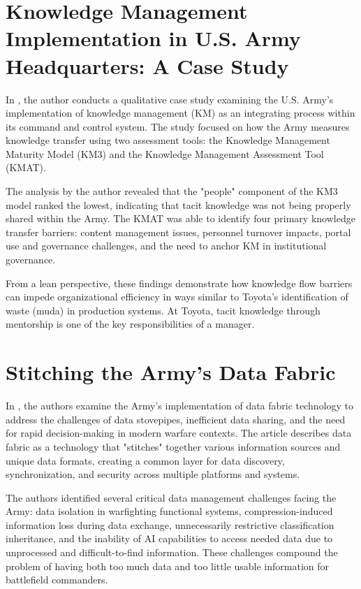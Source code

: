 \documentclass{article}
\begin{document}
		\section{Knowledge Management Implementation in U.S. Army Headquarters: A Case Study \cite{VanLaar2023}}

			In \cite{VanLaar2023}, the author conducts a qualitative case study examining the U.S. Army's implementation of knowledge management (KM) as an integrating process within its command and control system. 
			The study focused on how the Army measures knowledge transfer using two assessment tools: the Knowledge Management Maturity Model (KM3) and the Knowledge Management Assessment Tool (KMAT). 

			The analysis by the author revealed that the "people" component of the KM3 model ranked the lowest, indicating that tacit knowledge was not being properly shared within the Army.
			The KMAT was able to identify four primary knowledge transfer barriers: content management issues, personnel turnover impacts, portal use and governance challenges, and the need to anchor KM in institutional governance.

			From a lean perspective, these findings demonstrate how knowledge flow barriers can impede organizational efficiency in ways similar to Toyota's identification of waste (muda) in production systems. 
			At Toyota, tacit knowledge through mentorship is one of the key responsibilities of a manager.


	\section{Stitching the Army's Data Fabric \cite{Patel2021}}

		In \cite{Patel2021}, the authors examine the Army's implementation of data fabric technology to address the challenges of data stovepipes, inefficient data sharing, and the need for rapid decision-making in modern warfare contexts.
		The article describes data fabric as a technology that "stitches" together various information sources and unique data formats, creating a common layer for data discovery, synchronization, and security across multiple platforms and systems.

		The authors identified several critical data management challenges facing the Army: data isolation in warfighting functional systems, compression-induced information loss during data exchange, unnecessarily restrictive classification inheritance, and the inability of AI capabilities to access needed data due to unprocessed and difficult-to-find information.
		These challenges compound the problem of having both too much data and too little usable information for battlefield commanders.
\end{document}
